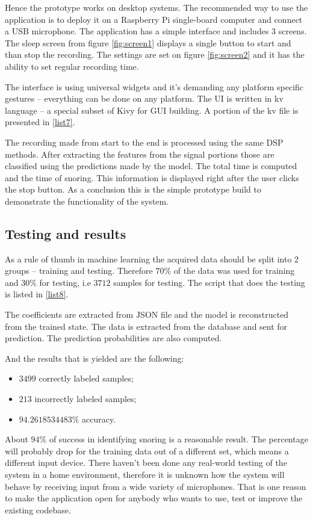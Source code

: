 Hence the prototype works on desktop systems. The recommended way to use the application is to deploy it on a Raspberry Pi single-board computer and connect a USB microphone. The application has a simple interface and includes 3 screens. The sleep screen from figure \ref{fig:screen1} displays a single button to start and than stop the recording. The settings are set on figure \ref{fig:screen2} and it has the ability to set regular recording time.

The interface is using universal widgets and it's demanding any platform specific gestures -- everything can be done on any platform. The UI is written in kv language -- a special subset of Kivy for GUI building. A portion of the kv file is presented in \ref{list7}.

The recording made from start to the end is processed using the same DSP methods. After extracting the features from the signal portions those are classified using the predictions made by the model. The total time is computed and the time of snoring. This information is displayed right after the user clicks the stop button. As a conclusion this is the simple prototype build to demonstrate the functionality of the system.

\subsection{Testing and results}

As a rule of thumb in machine learning the acquired data should be split into 2 groups -- training and testing. Therefore $70\%$ of the data was used for training and $30\%$ for testing, i.e $3712$ samples for testing. The script that does the testing is listed in \ref{list8}. 

The coefficients are extracted from JSON file and the model is reconstructed from the trained state. The data is extracted from the database and sent for prediction. The prediction probabilities are also computed.



And the results that is yielded are the following:

\begin{itemize}[topsep=5pt, partopsep=0pt,itemsep=3pt,parsep=1pt]
 \item $3499$ correctly labeled samples;
 \item $213$ incorrectly labeled samples;
 \item $94.2618534483\%$ accuracy. 
\end{itemize}

About $94\%$ of success in identifying snoring is a reasonable result. The percentage will probably drop for the training data out of a different set, which means a different input device. There haven't been done any real-world testing of the system in a home environment, therefore it is unknown how the system will behave by receiving input from a wide variety of microphones. That is one reason to make the application open for anybody who wants to use, test or improve the existing codebase. 

\clearpage